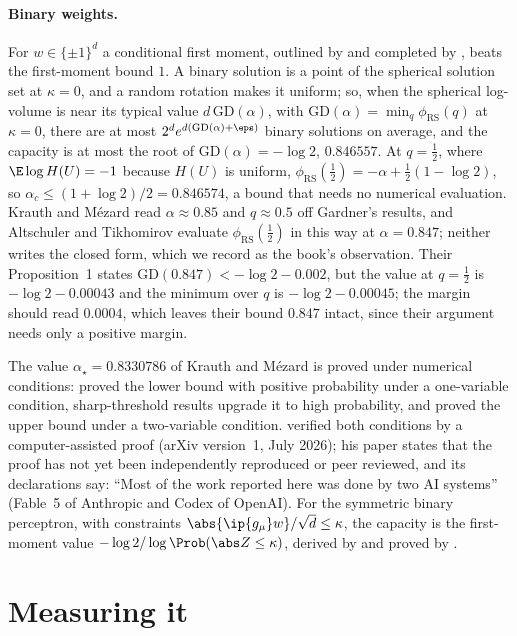 \begin{refsection}
\paragraph{Binary weights.} For $w\in\{\pm1\}^d$ a conditional first moment, outlined by \textcite[Section~5]{KrauthMezard1989} and completed by \textcite{AltschulerTikhomirov2024}, beats the first-moment bound $1$. A binary solution is a point of the spherical solution set at $\kappa=0$, and a random rotation makes it uniform; so, when the spherical log-volume is near its typical value $d\,\mathrm{GD}(\alpha)$, with $\mathrm{GD}(\alpha)=\min_q\phi_{\mathrm{RS}}(q)$ at $\kappa=0$, there are at most $2^de^{d(\mathrm{GD}(\alpha)+\eps)}$ binary solutions on average, and the capacity is at most the root of $\mathrm{GD}(\alpha)=-\log2$, $0.846557$. At $q=\frac12$, where $\E\log H(U)=-1$ because $H(U)$ is uniform, $\phi_{\mathrm{RS}}(\frac12)=-\alpha+\frac12(1-\log2)$, so $\alpha_c\le(1+\log2)/2=0.846574$, a bound that needs no numerical evaluation. Krauth and Mézard read $\alpha\approx0.85$ and $q\approx0.5$ off Gardner's results, and Altschuler and Tikhomirov evaluate $\phi_{\mathrm{RS}}(\frac12)$ in this way at $\alpha=0.847$; neither writes the closed form, which we record as the book's observation. Their Proposition~1 states $\mathrm{GD}(0.847)<-\log2-0.002$, but the value at $q=\frac12$ is $-\log2-0.00043$ and the minimum over $q$ is $-\log2-0.00045$; the margin should read $0.0004$, which leaves their bound $0.847$ intact, since their argument needs only a positive margin.

The value $\alpha_\star=0.8330786$ of Krauth and Mézard is proved under numerical conditions: \textcite{DingSun2019} proved the lower bound with positive probability under a one-variable condition, sharp-threshold results \parencite{Xu2021,NakajimaSun2023} upgrade it to high probability, and \textcite{Huang2024} proved the upper bound under a two-variable condition. \Textcite{Shmalo2026} verified both conditions by a computer-assisted proof (arXiv version~1, July 2026); his paper states that the proof has not yet been independently reproduced or peer reviewed, and its declarations say: ``Most of the work reported here was done by two AI systems'' (Fable~5 of Anthropic and Codex of OpenAI). For the symmetric binary perceptron, with constraints $\abs{\ip{g_\mu}w}/\sqrt d\le\kappa$, the capacity is the first-moment value $-\log2/\log\Prob(\abs Z\le\kappa)$, derived by \textcite{AubinPerkinsZdeborova2019} and proved by \textcite{AbbeLiSly2021}.

\section{Measuring it}\label{sec:gordon:measuring}


\end{refsection}

